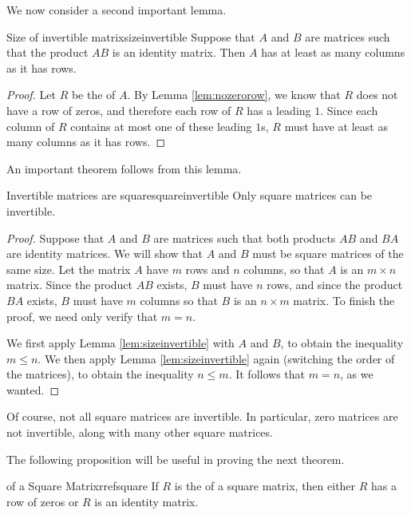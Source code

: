 We now consider a second important lemma.

\begin{lemma}{Size of invertible matrix}{sizeinvertible}
Suppose that $A$ and $B$ are matrices such that the product $AB$ is an identity matrix. Then $A$ has at least as many columns as it has rows.
\end{lemma}

\begin{proof}
Let $R$ be the {\rref} of $A$. By Lemma \ref{lem:nozerorow}, we know that $R$ does not have a row of zeros, and therefore each row of $R$ has a leading $1$. Since each column of $R$ contains at most one of these leading $1$s, $R$ must have at least as many columns as it has rows.
\end{proof}

An important theorem follows from this lemma. 

\begin{theorem}{Invertible matrices are square}{squareinvertible}
Only square matrices can be invertible.
\end{theorem}

\begin{proof}
Suppose that $A$ and $B$ are matrices such that both products $AB$ and $BA$ are identity matrices. We will show that $A$ and $B$ must be square matrices of the same size. Let the matrix $A$ have $m$ rows and $n$ columns, so that $A$ is an $m \times n$ matrix. Since the product $AB$ exists, $B$ must have $n$ rows, and since the product $BA$ exists, $B$ must have $m$ columns so that $B$ is an $n \times m$ matrix. To finish the proof, we need only verify that $m=n$. 

We first apply Lemma \ref{lem:sizeinvertible} with $A$ and $B$, to obtain the inequality $m \leq n$. We then apply Lemma \ref{lem:sizeinvertible} again (switching the order of the matrices), to obtain the inequality $n \leq m$. It follows that $m=n$, as we wanted.
\end{proof}

Of course, not all square matrices are invertible. In particular, zero matrices are not invertible, along with many other square matrices. 

The following proposition will be useful in proving the next theorem.

\begin{proposition}{{\RREF} of a Square Matrix}{rrefsquare}
If $R$ is the {\rref} of a square matrix, then either $R$ has a row of zeros or $R$ is an identity matrix. 
\end{proposition}

